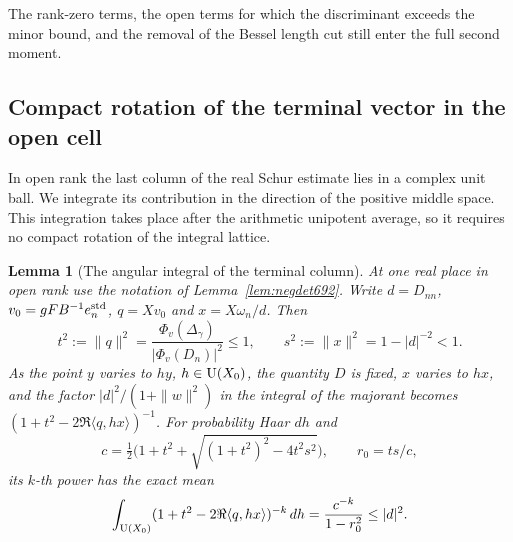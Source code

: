 \documentclass[a4paper,11pt]{article}
\newtheorem{lemma}[proposition]{Lemma}
\theoremstyle{definition}
\theoremstyle{remark}
\numberwithin{equation}{section}
\begin{document}
The rank-zero terms, the open terms for which the
discriminant exceeds the minor bound, and the removal of
the Bessel length cut still enter the full second moment.


\subsection{Compact rotation of the terminal vector in the open cell}
\label{sec:terminalrotation694}

In open rank the last column of the real Schur estimate lies
in a complex unit ball. We integrate its contribution in the
direction of the positive middle space. This integration takes
place after the arithmetic unipotent average, so it requires
no compact rotation of the integral lattice.

\begin{lemma}[The angular integral of the terminal column]\leavevmode
\label{lem:terminalrotation694}
At one real place in open rank use the notation of
Lemma~\ref{lem:negdet692}. Write \(d=D_{nn}\),
\(v_0=gF B^{-1}e_n^{\rm std}\), \(q=Xv_0\) and
\(x=X\omega_n/d\). Then
\[
 t^2:=\|q\|^2
     =\frac{\Phi_v(\Delta_\gamma)}{|\Phi_v(D_n)|^2}\le1,\qquad
 s^2:=\|x\|^2=1-|d|^{-2}<1 .
\]
As the point \(y\) varies to \(hy\), \(h\in{\rm U}(X_0)\), the
quantity \(D\) is fixed, \(x\) varies to \(hx\), and
the factor \(|d|^2/(1+\|w\|^2)\) in the integral of the
majorant becomes \((1+t^2-2\Re\langle q,hx\rangle)^{-1}\).
For probability Haar \(dh\) and
\[
 c=\tfrac12\bigl(1+t^2+\sqrt{(1+t^2)^2-4t^2s^2}\bigr),
 \qquad r_0=ts/c ,
\]
its \(k\)-th power has the exact mean
\[
 \int_{{\rm U}(X_0)}
       (1+t^2-2\Re\langle q,hx\rangle)^{-k}\,dh
       =\frac{c^{-k}}{1-r_0^2}\le |d|^2 .
\]
\end{lemma}
\end{document}
